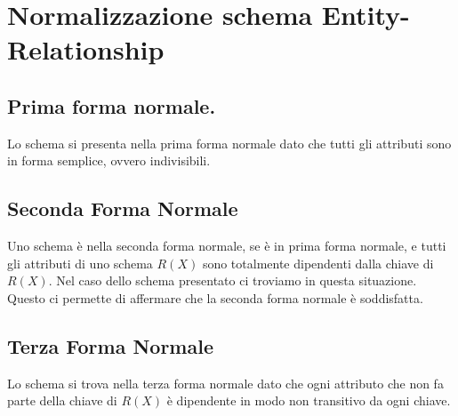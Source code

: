 \documentclass[12pt,a4paper]{article}
\begin{document}
\section{Normalizzazione schema Entity-Relationship}
\subsection{Prima forma normale.}
Lo schema si presenta nella prima forma normale dato che tutti gli attributi sono in forma semplice, ovvero indivisibili.
\subsection{Seconda Forma Normale}
Uno schema è nella seconda forma normale, se è in prima forma normale, e tutti gli attributi di uno schema $R(X)$ sono totalmente dipendenti dalla chiave di $R(X)$. Nel caso dello schema presentato ci troviamo in questa situazione. Questo ci permette di affermare che la seconda forma normale è soddisfatta.
\subsection{Terza Forma Normale}
Lo schema si trova nella terza forma normale dato che ogni attributo che non fa parte della chiave di $R(X)$ è dipendente in modo non transitivo da ogni chiave.
\end{document}
